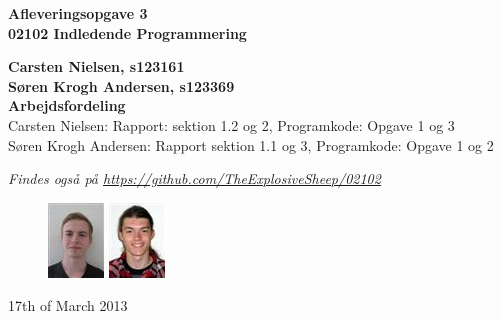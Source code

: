 \thispagestyle{empty} %
\begin{center}
\textbf{\Huge {Afleveringsopgave 3}\\ \vspace{1cm}
\huge{02102 Indledende Programmering}}
\end{center}
\vspace{1cm}
\begin{center}
\Large{\textbf{Carsten Nielsen, s123161 \\ Søren Krogh Andersen, s123369}} \\
\vspace{1cm}
\Large{\textbf{Arbejdsfordeling}} \\
Carsten Nielsen: Rapport: sektion 1.2 og 2, Programkode: Opgave 1 og 3 \\
Søren Krogh Andersen: Rapport sektion 1.1 og 3, Programkode: Opgave 1 og 2

\emph{Findes også på \url{https://github.com/TheExplosiveSheep/02102}}
\end{center}
\vspace{6cm}
\begin{figure}[h]
\hfill
\includegraphics{pictures/s123161.png}%
\includegraphics{pictures/s123369.png}%
\end{figure}
17th of March 2013

\thispagestyle{empty}
\newpage

